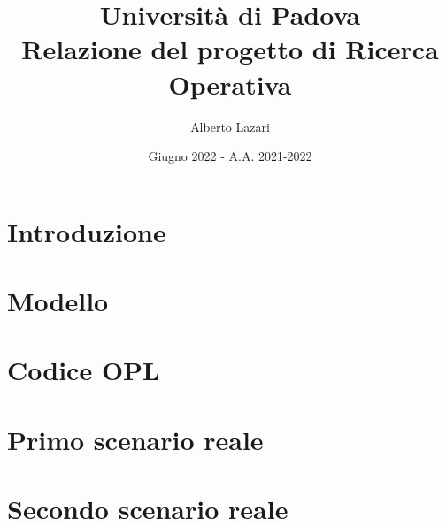 \documentclass[12pt, a4paper]{article}
\title{\textbf{Università di Padova \\ Relazione del progetto di Ricerca Operativa}}
\author{Alberto Lazari}
\date{Giugno 2022 - A.A. 2021-2022}
\begin{document}
	\maketitle
	\pagebreak

	\tableofcontents
	\pagebreak

	\section{Introduzione}
	

	\section{Modello}
	

	\section{Codice OPL}
	

	\section{Primo scenario reale}
	

	\section{Secondo scenario reale}
	
\end{document}
